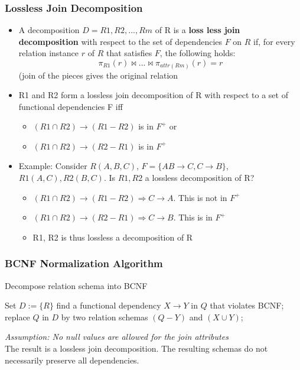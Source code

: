 \subsubsection{Lossless Join Decomposition}
\begin{itemize}[label=\(\rhd\)]
    \item A decomposition $D=R1,R2,...,Rm$ of R is a \textbf{loss less join decomposition} with respect to the set of dependencies $F$ on $R$ if, for every relation instance $r$ of $R$ that satisfies $F$, the following holds: \[
    \pi_{R1}(r) \bowtie ... \bowtie \pi_{attr(Rm)}(r)=r
    \] (join of the pieces gives the original relation
    \item R1 and R2 form a lossless join decomposition of R with respect to a set of functional dependencies F iff 
    \begin{itemize}[label=\(\rhd\)]
        \item $(R1 \cap R2) \rightarrow (R1-R2)$ is in $F^+$ or
        \item $(R1 \cap R2) \rightarrow (R2-R1)$ is in $F^+$
    \end{itemize}
    \item Example: Consider $R(A,B,C)$, $F=\{AB\rightarrow C, C \rightarrow B\}$, $R1(A,C), R2(B,C)$. Is $R1, R2$ a lossless decomposition of R?
    \begin{itemize}[label=\(\rhd\)]
        \item $(R1 \cap R2) \rightarrow (R1-R2) \Rightarrow C \rightarrow A$. This is not in $F^+$
        \item $(R1 \cap R2) \rightarrow (R2-R1) \Rightarrow C \rightarrow B$. This is in $F^+$ 
        \item R1, R2 is thus lossless a decomposition of R
    \end{itemize}
\end{itemize}

\subsubsection{BCNF Normalization Algorithm}
\begin{algorithm}
\caption{Decompose relation schema into BCNF}
\begin{algorithmic}[1] %
\State Set $D := \{R\}$
    \State find a functional dependency $X \rightarrow Y$ in $Q$ that violates BCNF;
    \State replace $Q$ in $D$ by two relation schemas $(Q - Y)$ and $(X \cup Y)$;
\EndWhile
\end{algorithmic}
\end{algorithm}
\quad \textit{Assumption: No null values are allowed for the join attributes}\\
The result is a lossless join decomposition. The resulting schemas do not necessarily preserve all dependencies.

